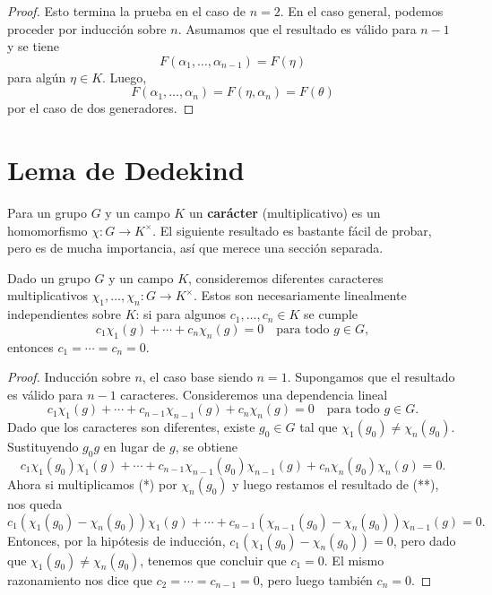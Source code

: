 \begin{teorema}
\begin{proof}
    Esto termina la prueba en el caso de $n = 2$. En el caso general, podemos
    proceder por inducción sobre $n$. Asumamos que el resultado es válido para
    $n-1$ y se tiene
    $$F (\alpha_1,\ldots,\alpha_{n-1}) = F (\eta)$$
    para algún $\eta \in K$. Luego,
    $$F (\alpha_1,\ldots,\alpha_n) = F (\eta,\alpha_n) = F (\theta)$$
    por el caso de dos generadores.
  \end{proof}
\end{teorema}


\section{Lema de Dedekind}

Para un grupo $G$ y un campo $K$ un \textbf{carácter} (multiplicativo) es un
homomorfismo $\chi\colon G\to K^\times$. El siguiente resultado es bastante
fácil de probar, pero es de mucha importancia, así que merece una sección
separada.

\begin{lema}
  \label{lema:independencia-de-caracteres}
  Dado un grupo $G$ y un campo $K$, consideremos diferentes caracteres
  multiplicativos $\chi_1,\ldots,\chi_n\colon G\to K^\times$. Estos son
  necesariamente linealmente independientes sobre $K$: si para algunos
  $c_1,\ldots,c_n \in K$ se cumple
  $$c_1 \chi_1 (g) + \cdots + c_n \chi_n (g) = 0 \quad\text{para todo }g\in G,$$
  entonces $c_1 = \cdots = c_n = 0$.

  \begin{proof}
    Inducción sobre $n$, el caso base siendo $n = 1$. Supongamos que
    el resultado es válido para $n-1$ caracteres.
    Consideremos una dependencia lineal
    \[ \tag{*} c_1 \chi_1 (g) + \cdots + c_{n-1} \chi_{n-1} (g) + c_n \chi_n (g)
       = 0 \quad\text{para todo }g\in G. \]
    Dado que los caracteres son diferentes, existe $g_0 \in G$ tal que
    $\chi_1 (g_0) \ne \chi_n (g_0)$. Sustituyendo $g_0 g$ en lugar de $g$,
    se obtiene
    \[ \tag{**} c_1 \chi_1 (g_0) \chi_1 (g) + \cdots +
       c_{n-1} \chi_{n-1} (g_0) \chi_{n-1} (g) + c_n \chi_n (g_0) \chi_n (g) = 0. \]
    Ahora si multiplicamos (*) por $\chi_n (g_0)$ y luego restamos el resultado
    de (**), nos queda
    \[ c_1 (\chi_1 (g_0) - \chi_n (g_0)) \chi_1 (g) + \cdots +
       c_{n-1} (\chi_{n-1} (g_0) - \chi_n (g_0)) \chi_{n-1} (g) = 0. \]
    Entonces, por la hipótesis de inducción,
    $c_1 (\chi_1 (g_0) - \chi_n (g_0)) = 0$, pero dado que
    $\chi_1 (g_0) \ne \chi_n (g_0)$, tenemos que concluir que $c_1 = 0$.
    El mismo razonamiento nos dice que $c_2 = \cdots = c_{n-1} = 0$, pero luego
    también $c_n = 0$.
  \end{proof}
\end{lema}


